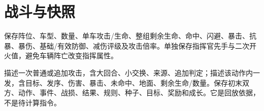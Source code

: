 \section{战斗与快照}
保存阵位、车型、数量、单车攻击/生命、整组剩余生命、命中、闪避、暴击、抗暴、暴伤、基础/有效防御、减伤评级及攻击倍率。单独保存指挥官先手与二次开火值，避免车辆阵亡改变指挥属性。

描述一次普通或追加攻击，含大回合、小交换、来源、追加判定；描述该动作内一发，含目标、发序、伤害、暴击、未命中、地面、剩余生命/数量。保存初末双方、动作、事件、战损、结果、规则、种子、目标、奖励和成长。它是回放依据，不是待计算指令。
